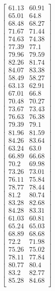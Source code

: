 \begin{equation}
\left[
\begin{array}{cc}
61.13 & 60.91 \\
65.01 & 64.8 \\
68.48 & 68.27 \\
71.67 & 71.44 \\
74.63 & 74.38 \\
77.39 & 77.1 \\
79.96 & 79.59 \\
82.26 & 81.74 \\
84.07 & 83.38 \\
58.49 & 58.27 \\
63.13 & 62.91 \\
67.01 & 66.8 \\
70.48 & 70.27 \\
73.67 & 73.43 \\
76.63 & 76.38 \\
79.39 & 79.1 \\
81.96 & 81.59 \\
84.26 & 83.64 \\
63.24 & 63.0 \\
66.89 & 66.68 \\
70.2 & 69.98 \\
73.26 & 73.01 \\
76.11 & 75.84 \\
78.77 & 78.44 \\
81.2 & 80.74 \\
83.28 & 82.68 \\
84.28 & 83.31 \\
61.03 & 60.81 \\
65.24 & 65.03 \\
68.89 & 68.68 \\
72.2 & 71.98 \\
75.26 & 75.02 \\
78.11 & 77.84 \\
80.77 & 80.4 \\
83.2 & 82.77 \\
85.28 & 84.68 \\
\end{array}
\right]
\end{equation}
